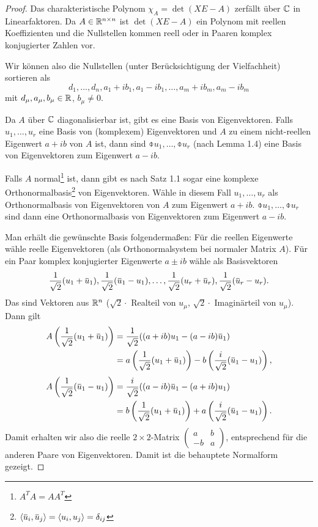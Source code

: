\begin{proof}
 Das charakteristische Polynom $\chi_A = \det ( XE - A )$ zerfällt über $\mathbb{C}$ in Linearfaktoren. Da $A \in \mathbb{R}^{n \times n}$ ist $\det(XE-A)$ ein Polynom mit reellen Koeffizienten und die Nullstellen kommen reell oder in Paaren komplex konjugierter Zahlen vor.
 
 Wir können also die Nullstellen (unter Berücksichtigung der Vielfachheit) sortieren als
 \[ d_1, \ldots, d_n, a_1 + i b_1, a_1 - i b_1, \ldots, a_m + i b_m, a_m - i b_m \]
 mit $d_\mu, a_\mu, b_\mu \in \mathbb{R}$, $b_\mu \ne 0$.
 
 Da $A$ über $\mathbb{C}$ diagonalisierbar ist, gibt es eine Basis von Eigenvektoren. Falls $u_1, \ldots, u_r$ eine Basis von (komplexem) Eigenvektoren und $A$ zu einem nicht-reellen Eigenwert $a + ib$ von $A$ ist, dann sind $\obar{u}_1, \ldots, \obar{u}_r$ (nach Lemma 1.4) eine Basis von Eigenvektoren zum Eigenwert $a - ib$. 
 
 Falls $A$ normal\footnote{$A^T A = A A^T$} ist, dann gibt es nach Satz 1.1 sogar eine komplexe Orthonormalbasis\footnote{$\scalar{\obar{u}_i, \obar{u}_j} = \scalar{u_i, u_j} = \delta_{ij}$} von Eigenvektoren. Wähle in diesem Fall $u_1, \ldots, u_r$ als Orthonormalbasis von Eigenvektoren von $A$ zum Eigenwert $a+ib$. $\obar{u}_1, \ldots, \obar{u}_r$ sind dann eine Orthonormalbasis von Eigenvektoren zum Eigenwert $a-ib$. 
 
 Man erhält die gewünschte Basis folgendermaßen: Für die reellen Eigenwerte wähle reelle Eigenvektoren (als Orthonormalsystem bei normaler Matrix $A$). Für ein Paar komplex konjugierter Eigenwerte $a \pm ib$ wähle als Basisvektoren
 \[ \rez{\sqrt{2}} ( u_1 + \obar{u}_1 ), \rez{\sqrt{2}} (\obar{u}_1 - u_1), \ldots, 
    \rez{\sqrt{2}} ( u_r + \obar{u}_r ), \rez{\sqrt{2}} (\obar{u}_r - u_r). \]
 Das sind Vektoren aus $\mathbb{R}^n$ ($\sqrt{2} \cdot$ Realteil von $u_\mu$, $\sqrt{2} \cdot$ Imaginärteil von $u_\mu$). Dann gilt
 \begin{align*}
 A \left( \rez{\sqrt{2}} ( u_1 + \obar{u}_1 ) \right) 
      &= \rez{\sqrt{2}} ( (a +ib) u_1 - (a-ib) \obar{u}_1 ) \\
      &= a \left( \rez{\sqrt{2}} ( u_1 + \obar{u}_1 ) \right ) 
       - b \left( \frac{i}{\sqrt{2}}( \obar{u}_1 - u_1 ) \right),
 \end{align*}
 \begin{align*}
  A \left( \rez{\sqrt{2}} ( \obar{u}_1 - u_1 ) \right) 
      &= \frac{i}{\sqrt{2}} ( (a -ib) \obar{u}_1 - (a+ib) u_1 ) \\
      &= b \left( \rez{\sqrt{2}} ( u_1 + \obar{u}_1 ) \right ) 
       + a \left( \frac{i}{\sqrt{2}}( \obar{u}_1 - u_1 ) \right).
 \end{align*}
 Damit erhalten wir also die reelle $2 \times 2$-Matrix $\begin{pmatrix} a & b \\ -b & a \end{pmatrix}$, entsprechend für die anderen Paare von Eigenvektoren. Damit ist die behauptete Normalform gezeigt.
 

\end{proof}
